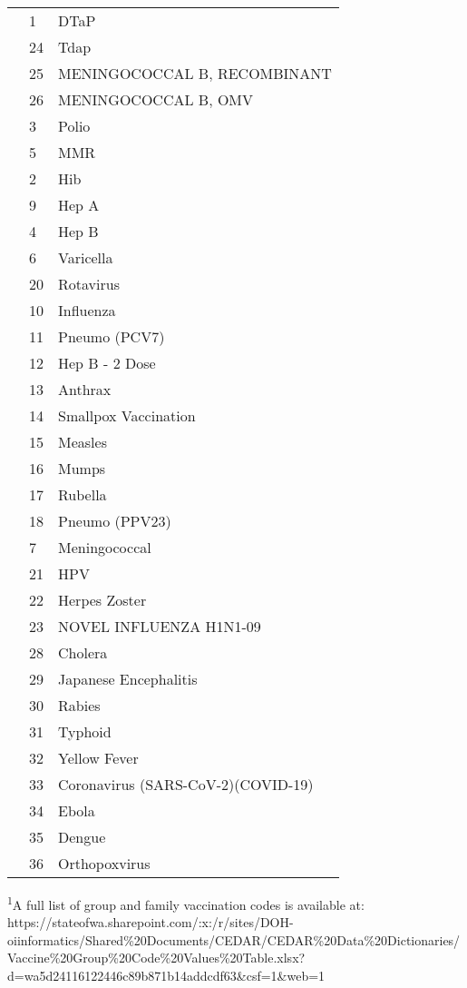 \documentclass[
  letterpaper,
  DIV=11,
  numbers=noendperiod]{scrreprt}
\begin{document}
\begin{longtable}{l|ll}
\midrule
  & 1 & DTaP \\ 
  & 24 & Tdap \\ 
  & 25 & MENINGOCOCCAL B, RECOMBINANT \\ 
  & 26 & MENINGOCOCCAL B, OMV \\ 
  & 3 & Polio \\ 
  & 5 & MMR \\ 
  & 2 & Hib \\ 
  & 9 & Hep A \\ 
  & 4 & Hep B \\ 
  & 6 & Varicella \\ 
  & 20 & Rotavirus \\ 
  & 10 & Influenza \\ 
  & 11 & Pneumo (PCV7) \\ 
  & 12 & Hep B - 2 Dose \\ 
  & 13 & Anthrax \\ 
  & 14 & Smallpox Vaccination \\ 
  & 15 & Measles \\ 
  & 16 & Mumps \\ 
  & 17 & Rubella \\ 
  & 18 & Pneumo (PPV23) \\ 
  & 7 & Meningococcal \\ 
  & 21 & HPV \\ 
  & 22 & Herpes Zoster \\ 
  & 23 & NOVEL INFLUENZA H1N1-09 \\ 
  & 28 & Cholera \\ 
  & 29 & Japanese Encephalitis \\ 
  & 30 & Rabies \\ 
  & 31 & Typhoid \\ 
  & 32 & Yellow Fever \\ 
  & 33 & Coronavirus (SARS-CoV-2)(COVID-19) \\ 
  & 34 & Ebola \\ 
  & 35 & Dengue \\ 
  & 36 & Orthopoxvirus \\ 
\bottomrule
\end{longtable}
\begin{minipage}{\linewidth}
\textsuperscript{1}A full list of group and family vaccination codes is available at: https://stateofwa.sharepoint.com/:x:/r/sites/DOH-oiinformatics/Shared\%20Documents/CEDAR/CEDAR\%20Data\%20Dictionaries/Vaccine\%20Group\%20Code\%20Values\%20Table.xlsx?d=wa5d24116122446c89b871b14addcdf63\&csf=1\&web=1\\
\end{minipage}
\end{document}

